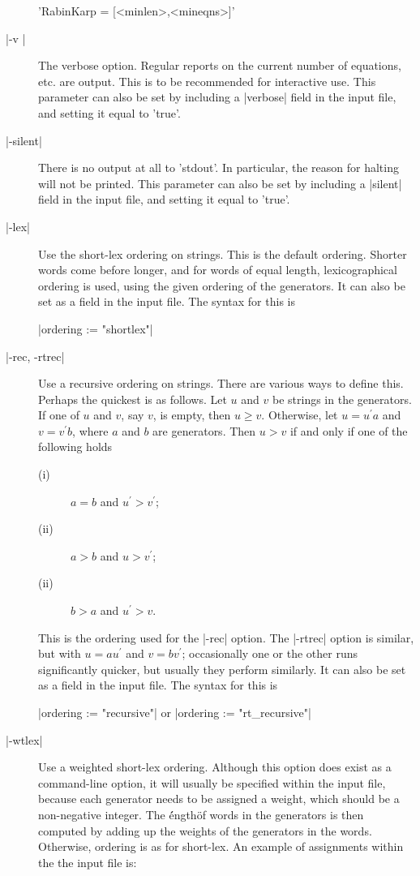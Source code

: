 \begin{description}
'RabinKarp \:= [<minlen>,<mineqns>]'
\item[|-v |]
The verbose option. Regular reports on the current number of equations, etc. are
output. This is to be recommended for interactive use.
This parameter can also be set by including a |verbose| field in the input
file, and setting it equal to 'true'.
\item[|-silent|]
There is no output at all to 'stdout'. In particular, the reason for
halting will not be printed.
This parameter can also be set by including a |silent| field in the input
file, and setting it equal to 'true'.
\item[|-lex|]
Use the short-lex ordering on strings. This is the default ordering.
Shorter words come before longer, and for words of equal length,
lexicographical ordering is used, using the given ordering of the generators.
It can also be set as a field in the input file. The syntax for this is

|ordering := "shortlex"|
\item[|-rec, -rtrec|]
Use a recursive ordering on strings. 
There are various ways to define this. Perhaps the quickest is as
follows. Let $u$ and $v$ be strings in the generators.
If one of $u$ and $v$, say $v$,  is empty, then $u \ge v$.
Otherwise, let $u=u^\prime a$ and $v=v^\prime b$,
where $a$ and $b$ are generators.
Then $u > v$ if and only if one of the following holds\:
\begin {description}
\item[(i)] $a = b$ and $u^\prime > v^\prime$;
\item[(ii)] $a > b$ and $u > v^\prime$;
\item[(ii)] $b > a$ and $u^\prime > v$.
\end {description}
This is the ordering used for the |-rec| option. The |-rtrec| option is
similar, but with $u=au^\prime$ and $v=bv^\prime$;
occasionally one or the other runs
significantly quicker, but usually they perform similarly.
It can also be set as a field in the input file. The syntax for this is

|ordering := "recursive"| \hspace{1cm} or  \hspace{1cm}
|ordering := "rt_recursive"|

\item[|-wtlex|]
Use a weighted short-lex ordering.
Although this option does exist as a command-line option, it will usually
be specified within the input file, because each generator needs to be
assigned a weight, which should be a non-negative integer. The \'\'ength\"
of words in the generators is then computed by adding up the weights of the
generators in the words. Otherwise, ordering is as for short-lex.
An example of assignments within the the input file is:


\end{description}
